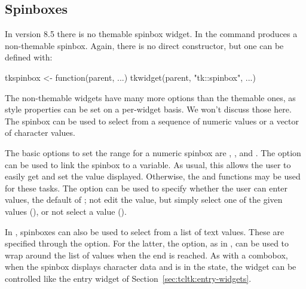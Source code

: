 \subsection{Spinboxes}
\label{sec:tcltk:spinboxes}

In \TK\/ version 8.5 there is no themable spinbox widget. In \TK\/ the
 command produces a non-themable spinbox. Again, there
is no direct  constructor, but one can be
defined with:
\begin{Schunk}
\begin{Sinput}
 tkspinbox <- function(parent, ...) 
   tkwidget(parent, "tk::spinbox", ...)
\end{Sinput}
\end{Schunk}

The non-themable widgets have many more options than the themable
ones, as style properties can be set on a per-widget basis. We won't
discuss those here. The spinbox can be used to select from a sequence
of numeric values or a vector of character values.


The basic options to set the range for a numeric spinbox are
, , and
.  The 
option can be used to link the spinbox to a \TCL\/ variable. As usual,
this allows the user to easily get and set the value
displayed. Otherwise, the  and 
functions may be used for these tasks. The option
 can be used to specify whether the user can
enter values, the default of ; not edit the value, but
simply select one of the given values (), or not
select a value ().

In \TK, spinboxes can also be used to select from a list of text
values. These are specified through the 
option. For the latter, the  option, as in
, can be used to wrap around the list of values when
the end is reached. As with a combobox, when the \TK\/ spinbox
displays character data and is in the  state, the widget
can be controlled like the entry widget of
Section~\ref{sec:tcltk:entry-widgets}.


